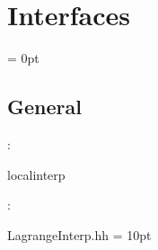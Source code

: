 
\section{Interfaces} 


\parskip = 0pt

\vspace{3mm} \subsection*{General}

: 

localinterp
\vspace{2mm}

\vspace{5mm}

: 



LagrangeInterp.hh
\vspace{2mm}\parskip = 10pt 

